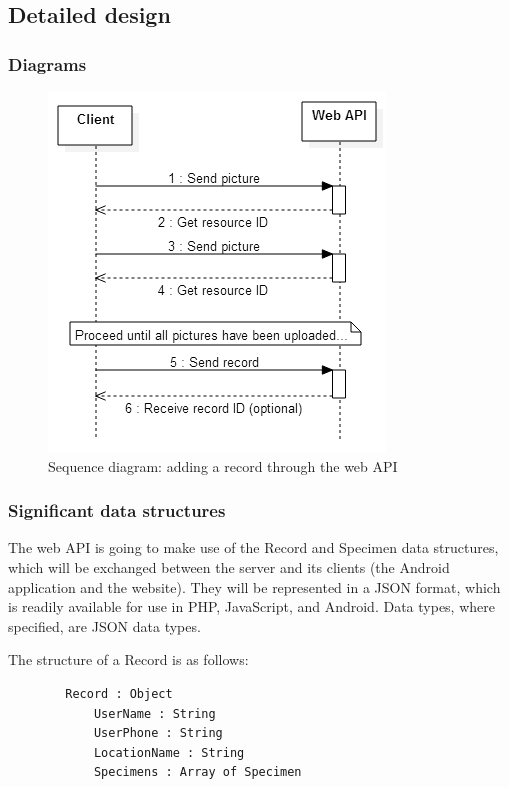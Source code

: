\subsection{Detailed design}
    \subsubsection{Diagrams}
        \begin{figure}
            \centering
            \includegraphics[scale=0.75]{server/working/SequenceDiagram-AddRecord.png}
            \caption{Sequence diagram: adding a record through the web API}
            \label{fig:addRecordSequenceDiagram}
        \end{figure}

    \subsubsection{Significant data structures}

        The web API is going to make use of the Record and Specimen data structures, which will be exchanged between the server and its clients (the Android application and the website). They will be represented in a JSON format, which is readily available for use in PHP, JavaScript, and Android. Data types, where specified, are JSON data types. 

        The structure of a Record is as follows:
        \begin{verbatim}
        Record : Object
            UserName : String
            UserPhone : String
            LocationName : String 
            Specimens : Array of Specimen
        \end{verbatim}

